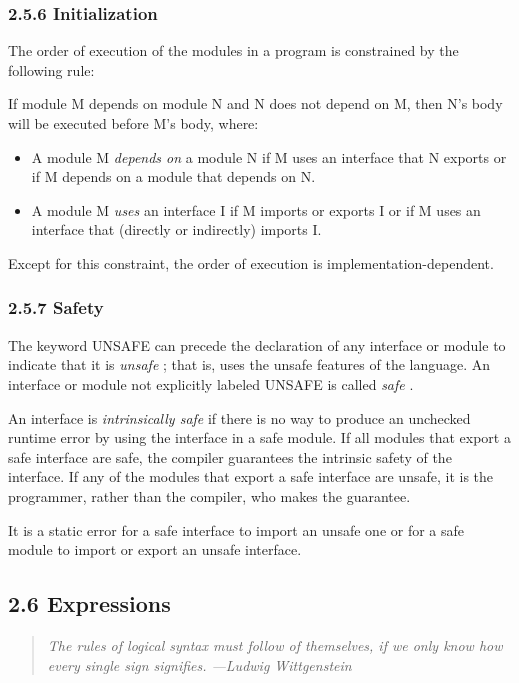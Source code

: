 \documentclass[10pt]{article}
\begin{document}
\subsubsection*{2.5.6 Initialization}

The order of execution of the modules in a program is constrained by the
following rule:

If module M depends on module N and N does not depend on M, then N's body will
be executed before M's body, where:
\begin{itemize}
\item A module M \emph{depends on} a module N if M uses an interface that N
  exports or if M depends on a module that depends on N.
\item A module M \emph{uses} an interface I if M imports or exports I or if M
  uses an interface that (directly or indirectly) imports I.
\end{itemize}

Except for this constraint, the order of execution is
implementation-dependent.

\subsubsection*{2.5.7 Safety}

The keyword UNSAFE can precede the declaration of any interface or module to
indicate that it is \emph{unsafe} ; that is, uses the unsafe features of the
language.  An interface or module not explicitly labeled UNSAFE is called
\emph{safe} .

An interface is \emph{intrinsically safe} if there is no way to produce an
unchecked runtime error by using the interface in a safe module.  If all
modules that export a safe interface are safe, the compiler guarantees the
intrinsic safety of the interface.  If any of the modules that export a safe
interface are unsafe, it is the programmer, rather than the compiler, who
makes the guarantee.

It is a static error for a safe interface to import an unsafe one or for a
safe module to import or export an unsafe interface.

\subsection*{2.6 Expressions}

\begin{quote}
  \emph{ The rules of logical syntax must follow of themselves, if we only
    know how every single sign signifies.  ---Ludwig Wittgenstein }
\end{quote}
\end{document}
